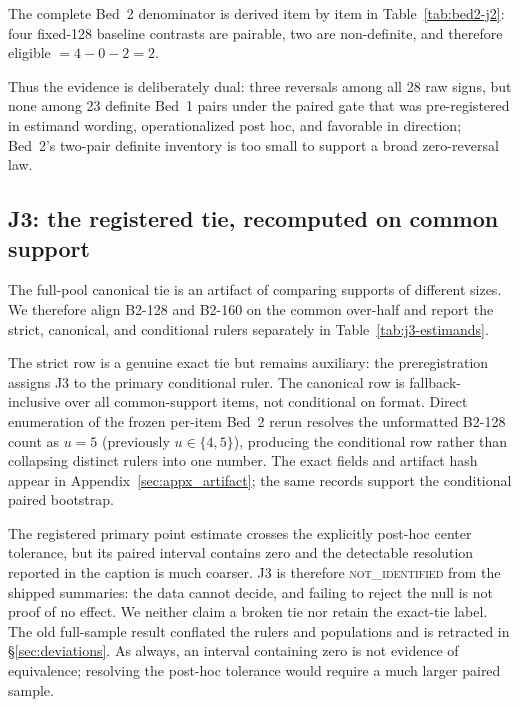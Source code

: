 \documentclass{article}
\begin{document}
The complete Bed~2 denominator is derived item by item in
Table~\ref{tab:bed2-j2}: four fixed-128 baseline contrasts are pairable, two
are non-definite, and therefore eligible $=4-0-2=2$.

Thus the evidence is deliberately dual: three reversals among all 28 raw signs,
but none among 23 definite Bed~1 pairs under the paired gate that was
pre-registered in estimand wording, operationalized post hoc, and favorable in
direction; Bed~2's
two-pair definite inventory is too small to support a broad zero-reversal law.

\subsection{J3: the registered tie, recomputed on common support}\label{sec:j3}

The full-pool canonical tie is an artifact of comparing supports of different
sizes.  We therefore align \textsc{B2-128} and \textsc{B2-160} on the common over-half and
report the strict, canonical, and conditional rulers separately in
Table~\ref{tab:j3-estimands}.

The strict row is a genuine exact tie but remains auxiliary: the
preregistration assigns J3 to the primary conditional ruler.  The canonical
row is fallback-inclusive over all common-support items, not conditional on
format.  Direct enumeration of the frozen per-item Bed~2 rerun resolves the
unformatted B2-128 count as $u{=}5$ (previously $u\in\{4,5\}$), producing the conditional row rather
than collapsing distinct rulers into one number.  The exact fields and artifact
hash appear in Appendix~\ref{sec:appx_artifact}; the same records support the
conditional paired
bootstrap.

The registered primary point estimate crosses the explicitly post-hoc center
tolerance, but its
paired interval contains zero and the detectable resolution reported in the
caption is much coarser.  J3 is therefore \textsc{not\_identified} from the
shipped summaries: the data cannot decide, and failing to reject the null is
not proof of no effect.  We neither claim a broken tie nor retain the exact-tie
label.  The old
full-sample result conflated the rulers and populations and is retracted in
\S\ref{sec:deviations}.  As always, an interval containing zero is not evidence
of equivalence; resolving the post-hoc tolerance would require a much larger
paired sample.
\end{document}
